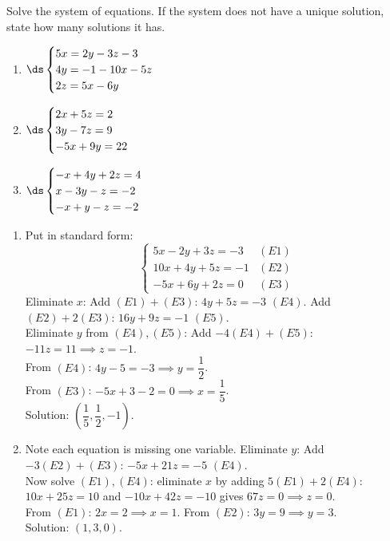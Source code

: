 \documentclass{ximera}
\begin{document}
\begin{problem}
Solve the system of equations. If the system does not have a unique solution, state how many solutions it has.
\begin{enumerate}
  \item[(a)] $\ds\begin{cases} 5x = 2y-3z-3\\ 4y = -1-10x-5z\\ 2z = 5x - 6y \end{cases}$
  \medskip
  \item[(b)] $\ds\begin{cases} 2x + 5z = 2\\ 3y - 7z = 9\\ -5x+9y = 22 \end{cases}$
  \medskip
  \item[(c)] $\ds\begin{cases} -x+4y+2z = 4\\ x - 3y - z = -2\\ -x+y-z = -2 \end{cases}$
\end{enumerate}

\begin{solution}
\begin{enumerate}
  \item[(a)] Put in standard form:
  $$\begin{cases} 5x-2y+3z=-3 & (E1)\\ 10x+4y+5z=-1 & (E2)\\ -5x+6y+2z=0 & (E3) \end{cases}$$
  Eliminate $x$: Add $(E1)+(E3)$: $4y+5z=-3$ $(E4)$. Add $(E2)+2(E3)$: $16y+9z=-1$ $(E5)$.\\
  Eliminate $y$ from $(E4),(E5)$: Add $-4(E4)+(E5)$: $-11z=11 \implies z=-1$.\\
  From $(E4)$: $4y-5=-3 \implies y=\dfrac{1}{2}$.\\
  From $(E3)$: $-5x+3-2=0 \implies x=\dfrac{1}{5}$.\\
  Solution: $\left(\dfrac{1}{5},\dfrac{1}{2},-1\right)$.

  \item[(b)] Note each equation is missing one variable. Eliminate $y$: Add $-3(E2)+(E3)$: $-5x+21z=-5$ $(E4)$.\\
  Now solve $(E1),(E4)$: eliminate $x$ by adding $5(E1)+2(E4)$: $10x+25z=10$ and $-10x+42z=-10$ gives $67z=0 \implies z=0$.\\
  From $(E1)$: $2x=2 \implies x=1$. From $(E2)$: $3y=9 \implies y=3$.\\
  Solution: $(1,3,0)$.


\end{enumerate}
\end{solution}
\end{problem}
\end{document}

